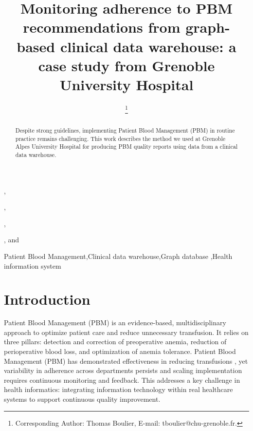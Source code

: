 \documentclass{IOS-Book-Article}
\def\hb{\hbox to 11.5 cm{}}
\begin{document}
\pagestyle{headings}
\def\thepage{}
\begin{frontmatter}

\title{Monitoring adherence to PBM recommendations from graph-based clinical data warehouse: a case study from Grenoble University Hospital}

\markboth{}{October 2025\hb}

\author[A]{ },
\author[A]{ },
\author[A]{ },
\author[A]{ %
\thanks{Corresponding Author: Thomas Boulier, E-mail: tboulier@chu-grenoble.fr.}}, 
and
\author[A]{ }

\address[A]{Univ. Grenoble Alpes, CNRS, UMR 5525, VetAgro Sup, Grenoble INP, CHU Grenoble Alpes, TIMC, 38000 Grenoble, France}

\begin{abstract}
Despite strong guidelines, implementing Patient Blood Management (PBM) in routine practice remains 
challenging. This work describes the method we used at Grenoble Alpes University Hospital for 
producing PBM quality reports using data from a clinical data warehouse.
\end{abstract}

\begin{keyword}
Patient Blood Management\sep Clinical data warehouse\sep Graph database \sep Health information system
\end{keyword}
\end{frontmatter}

\markboth{October 2025\hb}{October 2025\hb}

\section{Introduction}

Patient Blood Management (PBM) is an evidence-based, multidisciplinary approach to
optimize patient care and reduce unnecessary transfusion. 
It relies on three pillars: detection and correction of preoperative anemia, reduction 
of perioperative blood loss, and optimization of anemia tolerance. 
Patient Blood Management (PBM) has demonstrated effectiveness in reducing 
transfusions \cite{godonReductionRedBlood2024}, yet variability in adherence across 
departments persists and scaling implementation requires continuous monitoring and feedback.
This addresses a key challenge in health informatics: integrating information 
technology within real healthcare systems to support continuous quality improvement.
\end{document}
